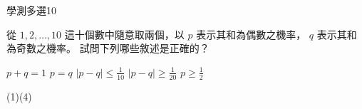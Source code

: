     \begin{QUESTION}
        \begin{ExamInfo}{93}{學測}{多選}{10}
        \end{ExamInfo}
        \begin{ExamAnsRateInfo}{43}{77}{40}{12}
        \end{ExamAnsRateInfo}
        \begin{QBODY}
            從 $1,2,\dots ,10$ 這十個數中隨意取兩個，以 $p$ 表示其和為偶數之機率， $q$ 表示其和為奇數之機率。 試問下列哪些敘述是正確的？
             \begin{QOPS} 
                \QOP $p+q=1$ 
                \QOP $p=q$  
                \QOP $|p-q| \leq \frac{1}{10} $ 
                \QOP $|p-q| \geq \frac{1}{20}$ \QOP $p\geq \frac{1}{2}$
            \end{QOPS}
        \end{QBODY}
        \begin{QFROMS}
        \end{QFROMS}
        \begin{QTAGS}\end{QTAGS}
        \begin{QANS}
            (1)(4)
        \end{QANS}
        \begin{QSOLLIST}
        \end{QSOLLIST}
        \begin{QEMPTYSPACE}
        \end{QEMPTYSPACE}
    \end{QUESTION}
